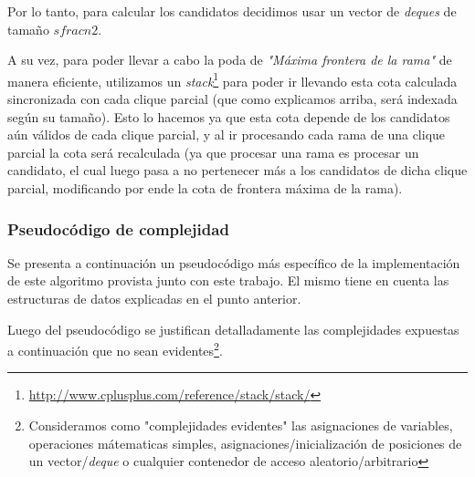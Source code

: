 \par Por lo tanto, para calcular los candidatos decidimos usar un vector de
    \emph{deques} de tama\~no $sfrac{n}{2}$.

\par A su vez, para poder llevar a cabo la poda de \emph{"M\'axima frontera de
    la rama"} de manera eficiente, utilizamos un \emph{stack}\footnote{%
    \url{http://www.cplusplus.com/reference/stack/stack/}} para poder ir
    llevando esta cota calculada sincronizada con cada clique parcial (que
    como explicamos arriba, ser\'a indexada seg\'un su tama\~no). Esto lo
    hacemos ya que esta cota depende de los candidatos a\'un v\'alidos
    de cada clique parcial, y al ir procesando cada rama de una clique
    parcial la cota ser\'a recalculada (ya que procesar una rama es
    procesar un candidato, el cual luego pasa a no pertenecer m\'as a
    los candidatos de dicha clique parcial, modificando por ende la
    cota de frontera m\'axima de la rama).

\subsubsection{Pseudoc\'odigo de complejidad}
\par Se presenta a continuaci\'on un pseudoc\'odigo m\'as espec\'ifico de la implementaci\'on
    de este algoritmo provista junto con este trabajo. El mismo tiene en cuenta
    las estructuras de datos explicadas en el punto anterior.

\par Luego del pseudoc\'odigo se justifican detalladamente las complejidades
    expuestas a continuaci\'on que no sean evidentes\footnote{Consideramos
    como "complejidades evidentes" las asignaciones de variables, operaciones
    m\'atematicas simples, asignaciones/inicializaci\'on de posiciones de
    un vector/\emph{deque} o cualquier contenedor de acceso aleatorio/arbitrario}.

\bigskip

